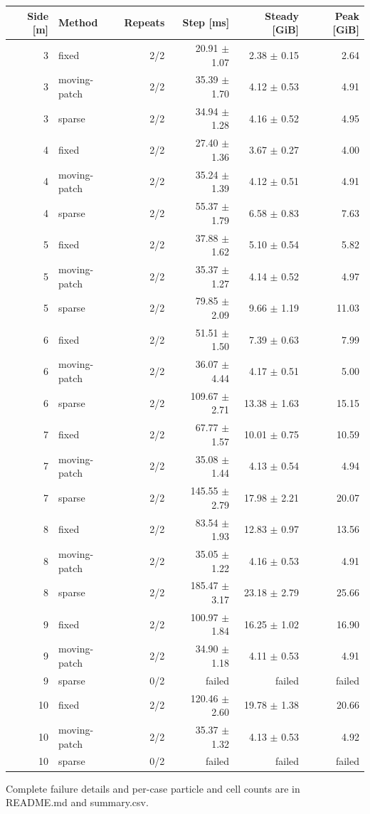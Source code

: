 \documentclass[10pt]{article}
\begin{document}
\begin{longtable}{rlrrrr}
\toprule
Side [m] & Method & Repeats & Step [ms] & Steady [GiB] & Peak [GiB] \\
\midrule\endhead
3 & fixed & 2/2 & 20.91 $\pm$ 1.07 & 2.38 $\pm$ 0.15 & 2.64 \\
3 & moving-patch & 2/2 & 35.39 $\pm$ 1.70 & 4.12 $\pm$ 0.53 & 4.91 \\
3 & sparse & 2/2 & 34.94 $\pm$ 1.28 & 4.16 $\pm$ 0.52 & 4.95 \\
4 & fixed & 2/2 & 27.40 $\pm$ 1.36 & 3.67 $\pm$ 0.27 & 4.00 \\
4 & moving-patch & 2/2 & 35.24 $\pm$ 1.39 & 4.12 $\pm$ 0.51 & 4.91 \\
4 & sparse & 2/2 & 55.37 $\pm$ 1.79 & 6.58 $\pm$ 0.83 & 7.63 \\
5 & fixed & 2/2 & 37.88 $\pm$ 1.62 & 5.10 $\pm$ 0.54 & 5.82 \\
5 & moving-patch & 2/2 & 35.37 $\pm$ 1.27 & 4.14 $\pm$ 0.52 & 4.97 \\
5 & sparse & 2/2 & 79.85 $\pm$ 2.09 & 9.66 $\pm$ 1.19 & 11.03 \\
6 & fixed & 2/2 & 51.51 $\pm$ 1.50 & 7.39 $\pm$ 0.63 & 7.99 \\
6 & moving-patch & 2/2 & 36.07 $\pm$ 4.44 & 4.17 $\pm$ 0.51 & 5.00 \\
6 & sparse & 2/2 & 109.67 $\pm$ 2.71 & 13.38 $\pm$ 1.63 & 15.15 \\
7 & fixed & 2/2 & 67.77 $\pm$ 1.57 & 10.01 $\pm$ 0.75 & 10.59 \\
7 & moving-patch & 2/2 & 35.08 $\pm$ 1.44 & 4.13 $\pm$ 0.54 & 4.94 \\
7 & sparse & 2/2 & 145.55 $\pm$ 2.79 & 17.98 $\pm$ 2.21 & 20.07 \\
8 & fixed & 2/2 & 83.54 $\pm$ 1.93 & 12.83 $\pm$ 0.97 & 13.56 \\
8 & moving-patch & 2/2 & 35.05 $\pm$ 1.22 & 4.16 $\pm$ 0.53 & 4.91 \\
8 & sparse & 2/2 & 185.47 $\pm$ 3.17 & 23.18 $\pm$ 2.79 & 25.66 \\
9 & fixed & 2/2 & 100.97 $\pm$ 1.84 & 16.25 $\pm$ 1.02 & 16.90 \\
9 & moving-patch & 2/2 & 34.90 $\pm$ 1.18 & 4.11 $\pm$ 0.53 & 4.91 \\
9 & sparse & 0/2 & failed & failed & failed \\
10 & fixed & 2/2 & 120.46 $\pm$ 2.60 & 19.78 $\pm$ 1.38 & 20.66 \\
10 & moving-patch & 2/2 & 35.37 $\pm$ 1.32 & 4.13 $\pm$ 0.53 & 4.92 \\
10 & sparse & 0/2 & failed & failed & failed \\
\bottomrule\end{longtable}
Complete failure details and per-case particle and cell counts are in README.md and summary.csv.
\end{document}
